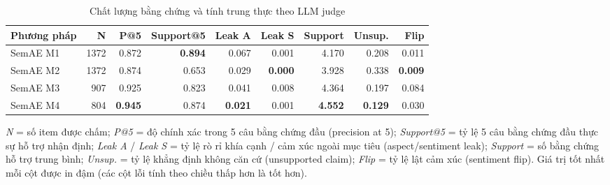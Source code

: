 \begin{table}[H]
\centering
\caption{Chất lượng bằng chứng và tính trung thực theo LLM judge}
\label{tab:evidence-faithfulness}
\begin{threeparttable}
\small
\begin{tabular}{l r r r r r r r r}
\toprule
\textbf{Phương pháp} & \textbf{N} & \textbf{P@5} & \textbf{Support@5} & \textbf{Leak A} & \textbf{Leak S} & \textbf{Support} & \textbf{Unsup.} & \textbf{Flip} \\
\midrule
SemAE M1 & 1372 & 0.872 & \textbf{0.894} & 0.067 & 0.001 & 4.170 & 0.208 & 0.011 \\
SemAE M2 & 1372 & 0.874 & 0.653 & 0.029 & \textbf{0.000} & 3.928 & 0.338 & \textbf{0.009} \\
SemAE M3 &  907 & 0.925 & 0.823 & 0.041 & 0.008 & 4.364 & 0.197 & 0.084 \\
SemAE M4 &  804 & \textbf{0.945} & 0.874 & \textbf{0.021} & 0.001 & \textbf{4.552} & \textbf{0.129} & 0.030 \\
\bottomrule
\end{tabular}
\begin{tablenotes}
\footnotesize
\item \textit{N} = số item được chấm; \textit{P@5} = độ chính xác trong 5 câu bằng chứng đầu (precision at 5); \textit{Support@5} = tỷ lệ 5 câu bằng chứng đầu thực sự hỗ trợ nhận định; \textit{Leak A} / \textit{Leak S} = tỷ lệ rò rỉ khía cạnh / cảm xúc ngoài mục tiêu (aspect/sentiment leak); \textit{Support} = số bằng chứng hỗ trợ trung bình; \textit{Unsup.} = tỷ lệ khẳng định không căn cứ (unsupported claim); \textit{Flip} = tỷ lệ lật cảm xúc (sentiment flip). Giá trị tốt nhất mỗi cột được in đậm (các cột lỗi tính theo chiều thấp hơn là tốt hơn).
\end{tablenotes}
\end{threeparttable}
\end{table}

